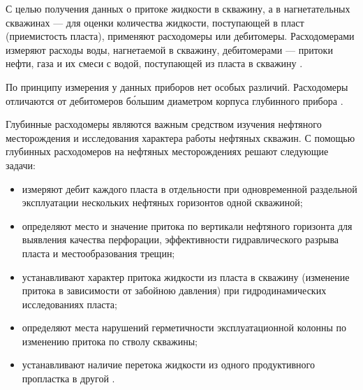 
С целью получения данных о притоке жидкости в скважину, а в нагнетательных скважинах --- для оценки количества жидкости, поступающей в пласт (приемистость пласта), применяют расходомеры или дебитомеры. Расходомерами измеряют расходы воды, нагнетаемой в скважину, дебитомерами --- притоки нефти, газа и их смеси с водой, поступающей из пласта в скважину \cite{debitraskhod}.

По принципу измерения у данных приборов нет особых различий. Расходомеры отличаются от дебитомеров б\'ольшим диаметром корпуса глубинного прибора \cite{mechdebit}.

Глубинные расходомеры являются важным средством изучения нефтяного месторождения и исследования характера работы нефтяных скважин. С помощью глубинных расходомеров на нефтяных месторождениях решают следующие задачи:
\begin{itemize}
    \item измеряют дебит каждого пласта в отдельности при одновременной раздельной эксплуатации нескольких нефтяных горизонтов одной скважиной;
    \item определяют место и значение притока по вертикали нефтяного горизонта для выявления качества перфорации, эффективности гидравлического разрыва пласта и местообразования трещин;
    \item устанавливают характер притока жидкости из пласта в скважину (изменение притока в зависимости от забойною давления) при гидродинамических исследованиях пласта;
    \item определяют места нарушений герметичности эксплуатационной колонны по изменению притока по стволу скважины; 
    \item устанавливают наличие перетока жидкости из одного продуктивного пропластка в другой \cite{mechdebit}.
\end{itemize}

\clearpage

